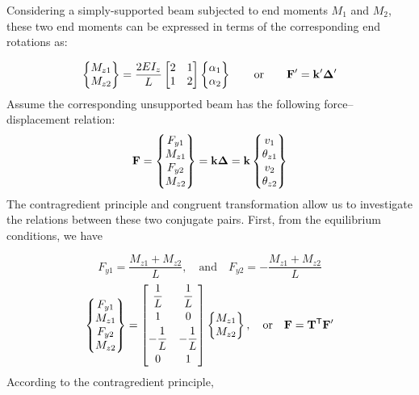 \begin{example}
Considering a simply-supported beam subjected to end moments $M_1$ and $M_2$, these two end moments can be expressed in terms of the corresponding end rotations as:
\begin{fig}
  
\end{fig}
\begin{equation*}
  \begin{Bmatrix}M_{z1}\\ M_{z2}\end{Bmatrix} = \frac{2EI_z}{L}\begin{bmatrix}2 & 1\\ 1 & 2\end{bmatrix}\begin{Bmatrix}\alpha_1\\ \alpha_2\end{Bmatrix}
  \qquad\text{or}\qquad \mathbf{F}' = \mathbf{k}'\bm{\Delta}'
\end{equation*}
Assume the corresponding unsupported beam has the following force--displacement relation:
\begin{equation*}
  \mathbf{F} = \begin{Bmatrix}F_{y1}\\ M_{z1}\\ F_{y2}\\ M_{z2}\end{Bmatrix} = \mathbf{k}\bm{\Delta} = \mathbf{k}\begin{Bmatrix}v_1\\ \theta_{z1}\\ v_2\\ \theta_{z2}\end{Bmatrix}
\end{equation*}
The contragredient principle and congruent transformation allow us to investigate the relations between these two conjugate pairs. First, from the equilibrium conditions, we have
\begin{fig}
  
\end{fig}
\begin{equation*}
  F_{y1} = \frac{M_{z1}+M_{z2}}{L},\quad\text{and}\quad F_{y2} = -\frac{M_{z1}+M_{z2}}{L}
\end{equation*}
\begin{equation*}
  \begin{Bmatrix}F_{y1}\\ M_{z1}\\ F_{y2}\\ M_{z2}\end{Bmatrix} =
  \begin{bmatrix} \dfrac1L & \dfrac1L\\[6pt] 1 & 0\\[3pt] -\dfrac1L & -\dfrac1L\\[6pt] 0 & 1\end{bmatrix}
  \begin{Bmatrix}M_{z1}\\ M_{z2}\end{Bmatrix},\quad\text{or}\quad \mathbf{F} = \mathbf{T}^{\mathsf{T}}\mathbf{F}'
\end{equation*}
According to the contragredient principle,

\end{example}
